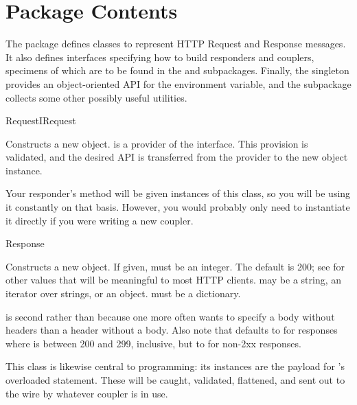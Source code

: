 \chapter{Package Contents}

The  package defines classes to represent HTTP Request and
Response messages. It also defines interfaces specifying how to build responders
and couplers, specimens of which are to be found in the  and
 subpackages. Finally, the  singleton provides an
object-oriented API for the  environment variable, and the
 subpackage collects some other possibly useful utilities.



\begin{classdesc}{Request}{IRequest}

Constructs a new  object.  is a provider of the
 interface. This provision is validated, and the desired API is
transferred from the  provider to the new object instance.

Your responder's  method will be given instances of this class,
so you will be using it constantly on that basis. However, you would probably
only need to instantiate it directly if you were writing a new coupler.

\end{classdesc}



\begin{classdesc}{Response}{  }

Constructs a new  object. If given,  must be an
integer. The default is 200; see
 for other values that will be meaningful to most HTTP clients. 
may be a string, an iterator over strings, or an 
object.  must be a dictionary.

 is second rather than  because one more often wants to
specify a body without headers than a header without a body. Also note that
 defaults to  for responses where
 is between 200 and 299, inclusive, but to  for
non-2xx responses.

This class is likewise central to  programming: its instances are
the payload for 's overloaded  statement. These will
be caught, validated, flattened, and sent out to the wire by whatever coupler is
in use.

\end{classdesc}




